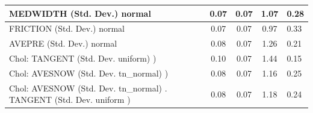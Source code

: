 \begin{table}
\begin{center}
\begin{tabular}{|l|l|c|c|c|l|}
			\hline
			MEDWIDTH (Std. Dev.) normal &  & 0.07 & 0.07 & 1.07 & 0.28 \\
			\hline
			FRICTION (Std. Dev.) normal &  & 0.07 & 0.07 & 0.97 & 0.33 \\
			\hline
			AVEPRE (Std. Dev.) normal &  & 0.08 & 0.07 & 1.26 & 0.21 \\
			\hline
			 Chol: TANGENT (Std. Dev. uniform) ) &  & 0.10 & 0.07 & 1.44 & 0.15 \\
			\hline
			 Chol: AVESNOW (Std. Dev. tn_normal) ) &  & 0.08 & 0.07 & 1.16 & 0.25 \\
			\hline
			 Chol: AVESNOW (Std. Dev. tn_normal) . TANGENT (Std. Dev.   uniform ) &  & 0.08 & 0.07 & 1.18 & 0.24 \\
			\hline
		\end{tabular}
	\end{center}
\end{table}